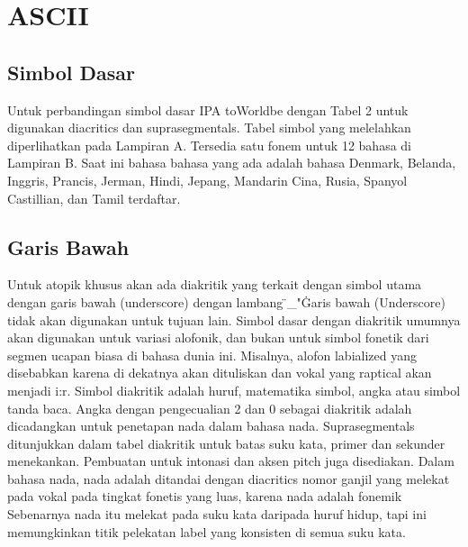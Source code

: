\section{ASCII}
\subsection{Simbol Dasar}
Untuk perbandingan simbol dasar IPA toWorldbe dengan  Tabel 2 untuk digunakan diacritics dan suprasegmentals. Tabel simbol yang melelahkan diperlihatkan pada Lampiran A. Tersedia satu fonem untuk 12 bahasa di Lampiran B. Saat ini bahasa bahasa yang ada adalah bahasa Denmark, Belanda, Inggris, Prancis, Jerman, Hindi, Jepang, Mandarin Cina, Rusia, Spanyol Castillian, dan Tamil terdaftar.
\subsection{Garis Bawah}
Untuk atopik khusus akan ada diakritik yang terkait dengan simbol utama dengan garis bawah (underscore) dengan lambang \"_"\. Garis bawah (Underscore) tidak akan digunakan untuk tujuan lain. Simbol dasar dengan diakritik umumnya akan digunakan untuk variasi alofonik, dan bukan untuk simbol fonetik dari segmen ucapan biasa di
bahasa dunia ini.
Misalnya, alofon labialized  yang disebabkan karena  di dekatnya
akan dituliskan  dan vokal yang raptical akan menjadi i:r. Simbol diakritik adalah huruf, matematika simbol, angka atau simbol tanda baca. Angka dengan pengecualian 2 dan 0 sebagai diakritik adalah
dicadangkan untuk penetapan nada dalam bahasa nada.
Suprasegmentals ditunjukkan dalam tabel diakritik untuk batas suku kata, primer dan sekunder menekankan. 
Pembuatan untuk intonasi dan aksen pitch juga disediakan. Dalam bahasa nada, nada adalah ditandai dengan diacritics nomor ganjil yang melekat pada vokal pada tingkat fonetis yang luas, karena nada
adalah fonemik Sebenarnya nada itu melekat pada suku kata daripada huruf hidup, tapi ini memungkinkan titik pelekatan label yang konsisten di semua suku kata.

